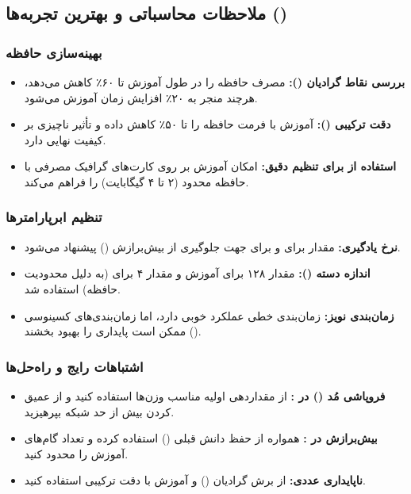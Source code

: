 \subsection{ملاحظات محاسباتی و بهترین تجربه‌ها ()}

\subsubsection{بهینه‌سازی حافظه}
\begin{itemize}
    \item \textbf{بررسی نقاط گرادیان ():} مصرف حافظه را در طول آموزش تا ۶۰٪ کاهش می‌دهد، هرچند منجر به ۲۰٪ افزایش زمان آموزش می‌شود.
    \item \textbf{دقت ترکیبی ():} آموزش با فرمت  حافظه را تا ۵۰٪ کاهش داده و تأثیر ناچیزی بر کیفیت نهایی دارد.
    \item \textbf{استفاده از  برای تنظیم دقیق:} امکان آموزش بر روی کارت‌های گرافیک مصرفی با حافظه  محدود (۲ تا ۴ گیگابایت) را فراهم می‌کند.
\end{itemize}



\subsubsection{تنظیم ابرپارامترها}
\begin{itemize}
    \item \textbf{نرخ یادگیری:} مقدار  برای  و  برای  جهت جلوگیری از بیش‌برازش () پیشنهاد می‌شود.
    \item \textbf{اندازه دسته ():} مقدار ۱۲۸ برای آموزش  و مقدار ۴ برای  (به دلیل محدودیت حافظه) استفاده شد.
    \item \textbf{زمان‌بندی نویز:} زمان‌بندی خطی عملکرد خوبی دارد، اما زمان‌بندی‌های کسینوسی () ممکن است پایداری را بهبود بخشند.
\end{itemize}

\subsubsection{اشتباهات رایج و راه‌حل‌ها}
\begin{itemize}
    \item \textbf{فروپاشی مُد () در :} از مقداردهی اولیه مناسب وزن‌ها استفاده کنید و از عمیق کردن بیش از حد شبکه بپرهیزید.
    \item \textbf{بیش‌برازش در :} همواره از حفظ دانش قبلی () استفاده کرده و تعداد گام‌های آموزش را محدود کنید.
    \item \textbf{ناپایداری عددی:} از برش گرادیان () و آموزش با دقت ترکیبی استفاده کنید.
\end{itemize}

